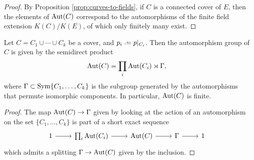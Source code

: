 \begin{proof}
 By Proposition \ref{prop:curves-to-fields}, if $C$ is a connected cover of $E$, then the elements of $\operatorname{Aut}(C)$ correspond to the automorphisms of the finite field extension $K(C)/K(E)$, of which only finitely many exist.
\end{proof}

\begin{prop}
 Let $C=C_1 \cup \dotsb \cup C_k$ be a cover, and $p_i\defeq p|_{C_i}$. Then the automorphism group of $C$ is given by the semidirect product \[\operatorname{Aut}(C) = \prod_i \operatorname{Aut}(C_i) \rtimes \Gamma,\] where $\Gamma \subset \operatorname{Sym}\{C_1, \dotsc, C_k\}$ is the subgroup generated by the automorphisms that permute isomorphic components. In particular, $\operatorname{Aut}(C)$ is finite.
\end{prop}
 
\begin{proof}
 The map $\operatorname{Aut}(C) \to \Gamma$ given by looking at the action of an automorphism on the set $\{C_1,\dotsc,C_k\}$ is part of a short exact sequence \[\ses{1}{\prod_i \Aut(C_i)}{\Aut(C)}{\Gamma}{}{}\]
 which admits a splitting $\Gamma \to \operatorname{Aut}(C)$ given by the inclusion.
\end{proof}

